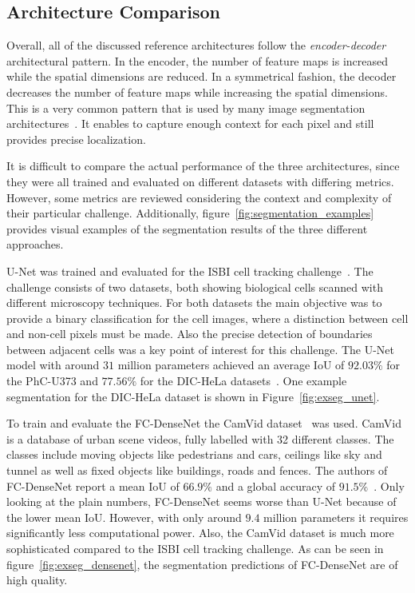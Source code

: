 \subsection{Architecture Comparison}
Overall, all of the discussed reference architectures follow the \emph{encoder-decoder} architectural pattern. In the encoder, the number of feature maps is increased while the spatial dimensions are reduced. In a symmetrical fashion, the decoder decreases the number of feature maps while increasing the spatial dimensions. This is a very common pattern that is used by many image segmentation architectures~\cite{imseg_survey20}. It enables to capture enough context for each pixel and still provides precise localization.

It is difficult to compare the actual performance of the three architectures, since they were all trained and evaluated on different datasets with differing metrics. However, some metrics are reviewed considering the context and complexity of their particular challenge. Additionally, figure~\ref{fig:segmentation_examples} provides visual examples of the segmentation results of the three different approaches.

U-Net was trained and evaluated for the ISBI cell tracking challenge~\cite{isbi_challenge}. The challenge consists of two datasets, both showing biological cells scanned with different microscopy techniques. For both datasets the main objective was to provide a binary classification for the cell images, where a distinction between cell and non-cell pixels must be made. Also the precise detection of boundaries between adjacent cells was a key point of interest for this challenge. The U-Net model with around $31$ million parameters achieved an average IoU of $92.03\%$ for the PhC-U373 and $77.56\%$ for the DIC-HeLa datasets~\cite{unet15}. One example segmentation for the DIC-HeLa dataset is shown in Figure~\ref{fig:exseg_unet}.

To train and evaluate the FC-DenseNet the CamVid dataset~\cite{camvid_challenge} was used. CamVid is a database of urban scene videos, fully labelled with 32 different classes. The classes include moving objects like pedestrians and cars, ceilings like sky and tunnel as well as fixed objects like buildings, roads and fences. The authors of FC-DenseNet report a mean IoU of $66.9\%$ and a global accuracy of $91.5\%$~\cite{denseseg17}. Only looking at the plain numbers, FC-DenseNet seems worse than U-Net because of the lower mean IoU. However, with only around $9.4$ million parameters it requires significantly less computational power. Also, the CamVid dataset is much more sophisticated compared to the ISBI cell tracking challenge. As can be seen in figure~\ref{fig:exseg_densenet}, the segmentation predictions of FC-DenseNet are of high quality.

